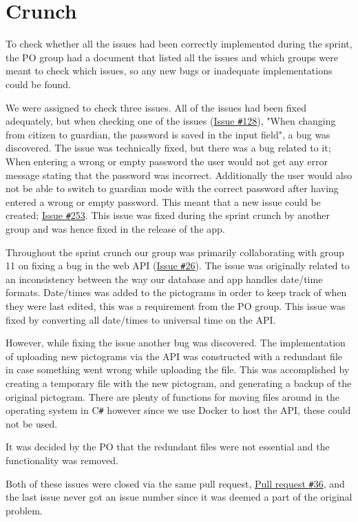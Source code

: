 \section{Crunch}
To check whether all the issues had been correctly implemented during the sprint, the PO group had a document that listed all the issues and which groups were meant to check which issues, so any new bugs or inadequate implementations could be found.

We were assigned to check three issues.
All of the issues had been fixed adequately, but when checking one of the issues (\href{https://github.com/aau-giraf/weekplanner/issues/128}{Issue \texttt{\#}128}), "When changing from citizen to guardian, the password is saved in the input field", a bug was discovered.
The issue was technically fixed, but there was a bug related to it; When entering a wrong or empty password the user would not get any error message stating that the password was incorrect.
Additionally the user would also not be able to switch to guardian mode with the correct password after having entered a wrong or empty password.
This meant that a new issue could be created; \href{https://github.com/aau-giraf/weekplanner/issues/253}{Issue \texttt{\#}253}.
This issue was fixed during the sprint crunch by another group and was hence fixed in the release of the app.

Throughout the sprint crunch our group was primarily collaborating with group 11 on fixing a bug in the web API (\href{https://github.com/aau-giraf/web-api/issues/26}{Issue \texttt{\#}26}).
The issue was originally related to an inconsistency between the way our database and app handles date/time formats. 
Date/times was added to the pictograms in order to keep track of when they were last edited, this was a requirement from the PO group. 
This issue was fixed by converting all date/times to universal time on the API. 

However, while fixing the issue another bug was discovered.
The implementation of uploading new pictograms via the API was constructed with a redundant file in case something went wrong while uploading the file. 
This was accomplished by creating a temporary file with the new pictogram, and generating a backup of the original pictogram. 
There are plenty of functions for moving files around in the operating system in C\texttt{\#} however since we use Docker to host the API, these could not be used. 

It was decided by the PO that the redundant files were not essential and the functionality was removed.

Both of these issues were closed via the same pull request, \href{https://github.com/aau-giraf/web-api/pull/36}{Pull request \texttt{\#}36}, and the last issue never got an issue number since it was deemed a part of the original problem. 
